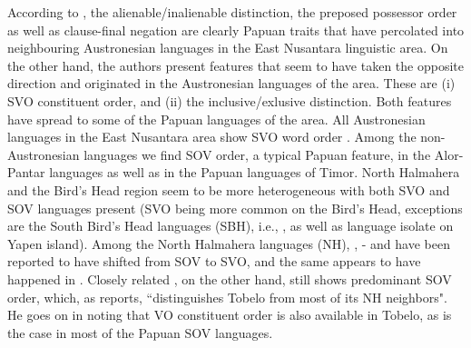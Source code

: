 According to \citet{klamer2008east}, the alienable/inalienable distinction, the preposed possessor order as well as clause-final negation are clearly Papuan traits that have percolated into neighbouring Austronesian languages in the East Nusantara linguistic area. On the other hand, the authors present features that seem to have taken the opposite direction and originated in the Austronesian languages of the area. These are (i) SVO constituent order, and (ii) the inclusive/exlusive distinction. Both features have spread to some of the Papuan languages of the area. All Austronesian languages in the East Nusantara area show SVO word order \citep[113]{klamer2008east}. Among the non-Austronesian languages we find SOV order, a typical Papuan feature, in the Alor-Pantar languages as well as in the Papuan languages of Timor. North Halmahera and the Bird's Head region seem to be more heterogeneous with both SVO and SOV languages present (SVO being more common on the Bird's Head, exceptions are the South Bird's Head languages (SBH), i.e., , as well as language isolate  on Yapen island). Among the North Halmahera languages (NH), , - and  have been reported to have shifted from SOV to SVO, and the same appears to have happened in  \citep[114]{klamer2008east}. Closely related , on the other hand, still shows predominant SOV order, which, as \citet[55]{holton2003tobelo} reports, ``distinguishes Tobelo from most of its NH neighbors". He goes on in noting that VO constituent order is also available in Tobelo, as is the case in most of the Papuan SOV languages.

